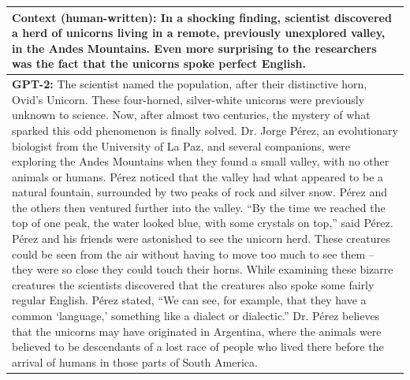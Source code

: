 \documentclass{article}
\begin{document}
{\renewcommand{\arraystretch}{2}%
\begin{table}[t]
\begin{center}
\begin{tabular}{|p{14cm}|}
\hline
\textbf{Context (human-written):}
In a shocking finding, scientist discovered a herd of unicorns living in a remote, previously unexplored valley, in the Andes Mountains. Even more surprising to the researchers was the fact that the unicorns spoke perfect English.
\\
\hline

\textbf{GPT-2:}
The scientist named the population, after their distinctive horn, Ovid's Unicorn. These four-horned, silver-white unicorns were previously unknown to science.
\newline\newline
Now, after almost two centuries, the mystery of what sparked this odd phenomenon is finally solved.
\newline\newline
Dr. Jorge P\'erez, an evolutionary biologist from the University of La Paz, and several companions, were exploring the Andes Mountains when they found a small valley, with no other animals or humans. P\'erez noticed that the valley had what appeared to be a natural fountain, surrounded by two peaks of rock and silver snow.
\newline\newline
P\'erez and the others then ventured further into the valley. ``By the time we reached the top of one peak, the water looked blue, with some crystals on top,'' said P\'erez.
\newline\newline
P\'erez and his friends were astonished to see the unicorn herd. These creatures could be seen from the air without having to move too much to see them -- they were so close they could touch their horns.
\newline\newline
While examining these bizarre creatures the scientists discovered that the creatures also spoke some fairly regular English. P\'erez stated, ``We can see, for example, that they have a common `language,' something like a dialect or dialectic.''
\newline\newline
Dr. P\'erez believes that the unicorns may have originated in Argentina, where the animals were believed to be descendants of a lost race of people who lived there before the arrival of humans in those parts of South America.

\end{tabular}
\end{center}
\end{table}}
\end{document}
